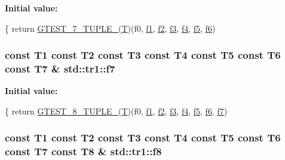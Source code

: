 {\bfseries Initial value\-:}
\begin{DoxyCode}
\{
  \textcolor{keywordflow}{return} \hyperlink{ts__gtest_8h_a8987baf82ee028d1d778447413a02c0c}{GTEST\_7\_TUPLE\_}(\hyperlink{calib3d_8hpp_a3efb9551a871ddd0463079a808916717}{T})(f0, \hyperlink{namespacestd_1_1tr1_a9c0fa65b105f8e2f58ba59ecf75fd000}{f1}, \hyperlink{namespacestd_1_1tr1_a87dd9e009868361317f587126dba63d4}{f2}, \hyperlink{namespacestd_1_1tr1_a0f7c3b47d27d42d82d1a333ea420ce4e}{f3}, \hyperlink{namespacestd_1_1tr1_adc796e02b7385d526aff708189564f67}{f4}, \hyperlink{namespacestd_1_1tr1_a9c1eb66b2b2fa321942af95405232a0d}{f5}, \hyperlink{namespacestd_1_1tr1_a6b62f32e1e3e21bceb94eb46c4cbfd56}{f6})
\end{DoxyCode}
\hypertarget{namespacestd_1_1tr1_a2185f3a1c07f2df072c39cb91ffa89a4}{
\subsubsection[{f7}]{\setlength{\rightskip}{0pt plus 5cm}const T1 const T2 const T3 const T4 const T5 const T6 const T7 \& std\-::tr1\-::f7}}\label{namespacestd_1_1tr1_a2185f3a1c07f2df072c39cb91ffa89a4}
{\bfseries Initial value\-:}
\begin{DoxyCode}
\{
  \textcolor{keywordflow}{return} \hyperlink{ts__gtest_8h_a2bc36d1a71a551e6cda2ac5504fb7ce3}{GTEST\_8\_TUPLE\_}(\hyperlink{calib3d_8hpp_a3efb9551a871ddd0463079a808916717}{T})(f0, \hyperlink{namespacestd_1_1tr1_a9c0fa65b105f8e2f58ba59ecf75fd000}{f1}, \hyperlink{namespacestd_1_1tr1_a87dd9e009868361317f587126dba63d4}{f2}, \hyperlink{namespacestd_1_1tr1_a0f7c3b47d27d42d82d1a333ea420ce4e}{f3}, \hyperlink{namespacestd_1_1tr1_adc796e02b7385d526aff708189564f67}{f4}, \hyperlink{namespacestd_1_1tr1_a9c1eb66b2b2fa321942af95405232a0d}{f5}, \hyperlink{namespacestd_1_1tr1_a6b62f32e1e3e21bceb94eb46c4cbfd56}{f6}, 
      \hyperlink{namespacestd_1_1tr1_a2185f3a1c07f2df072c39cb91ffa89a4}{f7})
\end{DoxyCode}
\hypertarget{namespacestd_1_1tr1_ab998afa41cea8d6d26d7e4288b0bf974}{
\subsubsection[{f8}]{\setlength{\rightskip}{0pt plus 5cm}const T1 const T2 const T3 const T4 const T5 const T6 const T7 const T8 \& std\-::tr1\-::f8}}\label{namespacestd_1_1tr1_ab998afa41cea8d6d26d7e4288b0bf974}
